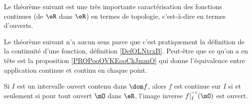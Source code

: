 Le théorème suivant est une très importante caractérisation des fonctions continues (de \( \eR\) dans \( \eR\)) en termes de topologie, c'est-à-dire en termes d'ouverts.

\begin{probleme}
	Le théorème suivant n'a aucun sens parce que c'est pratiquement la définition de la continuité d'une fonction, définition \ref{DefOLNtrxB}. Peut-être que ce qu'on a en tête est la proposition \ref{PROPooOVKEooCkJmmO} qui donne l'équivalence entre application continue et continu en chaque point.
\end{probleme}

\begin{theorem}     \label{ThoContInvOuvert}
	Si \( I\) est un intervalle ouvert contenu dans \( \dom f\), alors \( f\) est continue sur \( I\) si et seulement si pour tout ouvert \( \mO\) dans \( \eR\), l'image inverse \( f|_I^{^{-1}}(\mO)\) est ouvert.
\end{theorem}

